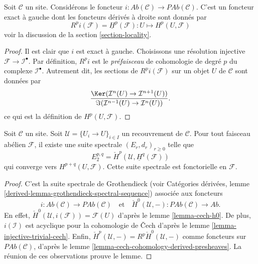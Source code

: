 \begin{lemma}
\label{lemma-include}
Soit $\mathcal{C}$ un site.
Considérons le foncteur
$i : \textit{Ab}(\mathcal{C}) \to \textit{PAb}(\mathcal{C})$.
C'est un foncteur exact à gauche dont les foncteurs dérivés à droite sont
donnés par
$$
R^pi(\mathcal{F}) = \underline{H}^p(\mathcal{F}) :
U \longmapsto H^p(U, \mathcal{F})
$$
voir la discussion de la section \ref{section-locality}.
\end{lemma}

\begin{proof}
Il est clair que $i$ est exact à gauche.
Choisissons une résolution injective $\mathcal{F} \to \mathcal{I}^\bullet$.
Par définition, $R^pi$ est le {\it préfaisceau} de cohomologie de degré $p$
du complexe $\mathcal{I}^\bullet$. Autrement dit, les sections de
$R^pi(\mathcal{F})$ sur un objet $U$ de $\mathcal{C}$ sont données par
$$
\frac{\Ker(\mathcal{I}^n(U) \to \mathcal{I}^{n + 1}(U))}
{\Im(\mathcal{I}^{n - 1}(U) \to \mathcal{I}^n(U))}.
$$
ce qui est la définition de $H^p(U, \mathcal{F})$.
\end{proof}

\begin{lemma}
\label{lemma-cech-spectral-sequence}
Soit $\mathcal{C}$ un site. Soit $\mathcal{U} = \{U_i \to U\}_{i \in I}$
un recouvrement de $\mathcal{C}$. Pour tout faisceau abélien $\mathcal{F}$,
il existe une suite spectrale $(E_r, d_r)_{r \geq 0}$ telle que
$$
E_2^{p, q} = \check{H}^p(\mathcal{U}, \underline{H}^q(\mathcal{F}))
$$
qui converge vers $H^{p + q}(U, \mathcal{F})$.
Cette suite spectrale est fonctorielle en $\mathcal{F}$.
\end{lemma}

\begin{proof}
C'est la suite spectrale de Grothendieck (voir Catégories dérivées,
lemme \ref{derived-lemma-grothendieck-spectral-sequence}) associée aux
foncteurs
$$
i :  \textit{Ab}(\mathcal{C}) \to \textit{PAb}(\mathcal{C})
\quad\text{et}\quad
\check{H}^0(\mathcal{U}, - ) : \textit{PAb}(\mathcal{C})
\to \textit{Ab}.
$$
En effet, $\check{H}^0(\mathcal{U}, i(\mathcal{F})) = \mathcal{F}(U)$ d'après
le lemme \ref{lemma-cech-h0}. De plus, $i(\mathcal{I})$ est acyclique pour la
cohomologie de {\v C}ech d'après le
lemme \ref{lemma-injective-trivial-cech}. Enfin,
$\check{H}^p(\mathcal{U}, -) = R^p\check{H}^0(\mathcal{U}, -)$ comme foncteurs
sur $\textit{PAb}(\mathcal{C})$, d'après le
lemme \ref{lemma-cech-cohomology-derived-presheaves}.
La réunion de ces observations prouve le lemme.
\end{proof}

